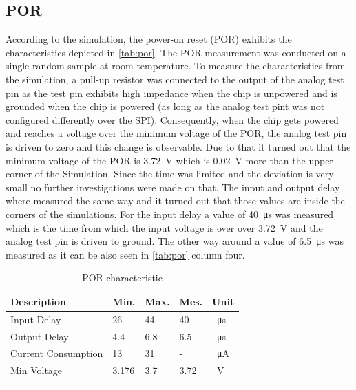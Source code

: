 \subsection{POR}
According to the simulation, the power-on reset (POR) exhibits the characteristics depicted in \autoref{tab:por}. The POR measurement was conducted on a single random sample at room temperature. To measure the characteristics from the simulation, a pull-up resistor was connected to the output of the analog test pin as the test pin exhibits high impedance when the chip is unpowered and is grounded when the chip is powered (as long as the analog test pint was not configured differently over the SPI).
Consequently, when the chip gets powered and reaches a voltage over the minimum voltage of the POR, the analog test pin is driven to zero and this change is observable. Due to that it turned out that the minimum voltage of the POR is \qty{3.72}{\volt} which is \qty{0.02}{\volt} more than the upper corner of the Simulation. Since the time was limited and the deviation is very small no further investigations were made on that. The input and output delay where measured the same way and it turned out that those values are inside the corners of the simulations. For the input delay a value of \qty{40}{\micro\second} was measured which is the time from which the input voltage is over over  \qty{3.72}{\volt} and the analog test pin is driven to ground. The other way around a value of \qty{6.5}{\micro\second} was measured as it can be also seen in \autoref{tab:por} column four.
\begin{longtable}{|p{5cm}|p{2cm}|p{2cm}|p{2cm}|p{2cm}|}
	\hline
	\rowcolor{lightgray}
	\textbf{Description} &\textbf{Min.} &\textbf{Max.} & \textbf{Mes.} & \textbf{Unit} \\ \hline
	
	Input Delay & 26 & 44 & 40  &\qty{}{\micro\second} \\ \hline
	Output Delay & 4.4 & 6.8 & 6.5 &\qty{}{\micro\second} \\ \hline
	Current Consumption & 13 & 31 & -& \qty{}{\micro\ampere} \\ \hline
	Min Voltage & 3.176& 3.7 & 3.72 & \qty{}{\volt} \\ \hline
	\caption{POR characteristic} %
	\label{tab:por}
\end{longtable}
